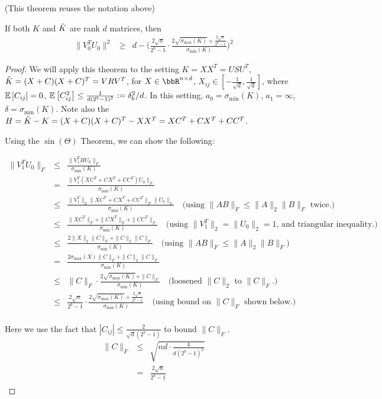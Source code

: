 (This theorem reuses the notation above)
\begin{theorem}
If both $K$ and $\tK$ are rank $d$ matrices, then
\begin{eqnarray*}
\|V_0^T U_0\|^2 &\geq& d - \Bigg(\frac{2\sqrt{n}}{2^b-1} \cdot \frac{2\sqrt{\sigma_{\max}(K)} + \frac{2\sqrt{n}}{2^b-1} }{\sigma_{\min}(K)} \Bigg)^2
\end{eqnarray*}
\end{theorem}
\begin{proof}
We will apply this theorem to the setting $K = XX^T = USU^T$, $\tK = (X+C)(X+C)^T = VRV^T$,
for $X \in \RR^{n \times d}$, $X_{ij}\in [-\frac{1}{\sqrt{d}},\frac{1}{\sqrt{d}}]$,
where $\expect{}{C_{ij}} = 0$, $\expect{}{C_{ij}^2} \leq \frac{1}{d(2^b-1)^2} \defeq \delta_b^2/d$.
In this setting, $a_0 = \sigma_{\min}(K)$, $a_1 = \infty$, $\delta=\sigma_{\min}(K)$.
Note also the $H = \tK-K = (X+C)(X+C)^T - XX^T = XC^T + CX^T + CC^T$.

Using the $\sin(\Theta)$ Theorem, we can show the following:

\begin{eqnarray*}
\|V_1^T U_0\|_F
&\leq& \frac{\|V_1^T H U_0\|_F}{\sigma_{\min}(K)}\\
&=& \frac{\|V_1^T (XC^T + CX^T + CC^T) U_0\|_F}{\sigma_{\min}(K)}\\
&\leq& \frac{\|V_1^T\|_2 \|XC^T + CX^T + CC^T\|_F \|U_0\|_2}{\sigma_{\min}(K)} \quad \text{(using $\|AB\|_F \leq \|A\|_2 \|B\|_F$ twice.)}\\
&\leq& \frac{\|XC^T\|_F + \|CX^T\|_F + \|CC^T\|_F}{\sigma_{\min}(K)} \quad \text{(using $\|V_1^T\|_2 = \|U_0\|_2 = 1$, and triangular inequality.)}\\
&\leq& \frac{2\|X\|_2\|C\|_F + \|C\|_2 \|C\|_F}{\sigma_{\min}(K)} \quad \text{(using $\|AB\|_F \leq \|A\|_2 \|B\|_F$)}\\
&=& \frac{2\sigma_{\max}(X)\|C\|_F + \|C\|_2 \|C\|_F}{\sigma_{\min}(K)} \\
&\leq& \|C\|_F \cdot \frac{2\sqrt{\sigma_{\max}(K)} + \|C\|_F }{\sigma_{\min}(K)}  \quad \text{(loosened $\|C\|_2$ to  $\|C\|_F$.)}\\
&\leq& \frac{2\sqrt{n}}{2^b-1} \cdot \frac{2\sqrt{\sigma_{\max}(K)} + \frac{2\sqrt{n}}{2^b-1} }{\sigma_{\min}(K)} \quad \text{(using bound on $\|C\|_F$ shown below.)} \\
\end{eqnarray*}

Here we use the fact that $|C_{ij}| \leq \frac{2}{\sqrt{d}(2^b-1)}$ to bound $\|C\|_F$.
\begin{eqnarray*}
\|C\|_F &\leq& \sqrt{nd \cdot \frac{4}{d(2^b-1)^2}} \\
&=& \frac{2\sqrt{n}}{2^b-1} \\
\end{eqnarray*}


\end{proof}
